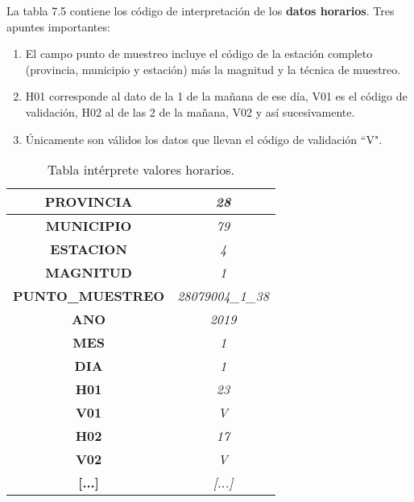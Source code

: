 La tabla 7.5 contiene los código de interpretación de los \textbf{datos horarios}. Tres apuntes importantes:

\begin{enumerate}
\item El campo punto de muestreo incluye el código de la estación completo (provincia, municipio y estación) más la magnitud y la técnica de muestreo.

\item H01 corresponde al dato de la 1 de la mañana de ese día, V01 es el código de validación, H02 al de las 2 de la mañana, V02 y así sucesivamente.

\item Únicamente son válidos los datos que llevan el código de validación “V".
\end{enumerate}


\begin{table}[H]
	\begin{center}
		\begin{tabular}{|c|c|}
			\hline
			\textbf{PROVINCIA}       & \textit{28}              \\ \hline
			\textbf{MUNICIPIO}       & \textit{79}              \\ \hline
			\textbf{ESTACION}        & \textit{4}               \\ \hline
			\textbf{MAGNITUD}        & \textit{1}               \\ \hline
			\textbf{PUNTO\_MUESTREO} & \textit{28079004\_1\_38} \\ \hline
			\textbf{ANO}             & \textit{2019}            \\ \hline
			\textbf{MES}             & \textit{1}               \\ \hline
			\textbf{DIA}             & \textit{1}               \\ \hline
			\textbf{H01}             & \textit{23}              \\ \hline
			\textbf{V01}             & \textit{V}               \\ \hline
			\textbf{H02}             & \textit{17}              \\ \hline
			\textbf{V02}             & \textit{V}               \\ \hline
			\textbf{[...]}             & \textit{[...]}               \\ \hline
		\end{tabular}
		\caption{Tabla intérprete valores horarios.}
	\end{center}
\label{TablaValHorarios}
\end{table}

